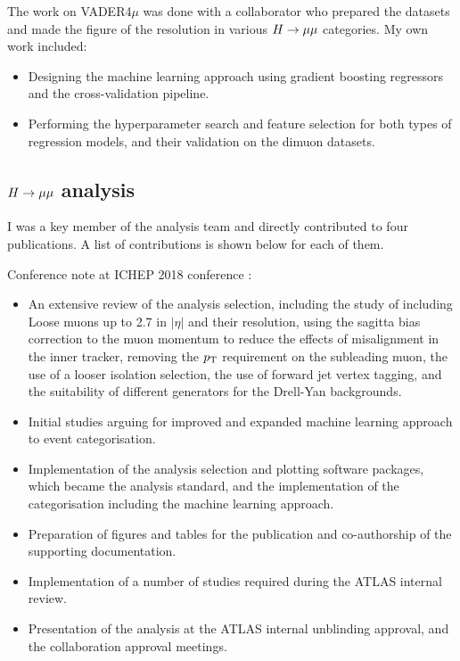 \begin{originality}
\noindent The work on VADER4$\mu$ was done with a collaborator who
prepared the datasets and made the figure of the resolution
in various $H \rightarrow \mu\mu$ categories. My own work included:
\begin{itemize}
\item Designing the machine learning approach using 
gradient boosting regressors and the cross-validation
pipeline.
\item Performing the hyperparameter search and feature
selection for both types of regression models, and
their validation on the dimuon datasets.
\end{itemize}

\subsection*{$H \rightarrow \mu\mu$ analysis}

I was a key member of the analysis team and directly
contributed to four publications. A list of contributions
is shown below for each of them.

\noindent Conference note at ICHEP 2018 conference \cite{ATLAS-CONF-2018-026}:
\begin{itemize}
\item An extensive review of the analysis selection, including the study
of including Loose muons up to 2.7 in $|\eta|$ and their resolution,
using the sagitta bias correction to the muon momentum to reduce
the effects of misalignment in the inner tracker, removing the $p_{\text{T}}$
requirement on the subleading muon, the use of a looser isolation
selection, the use of forward jet vertex tagging, and the suitability
of different generators for the Drell-Yan backgrounds.
\item Initial studies arguing for improved and expanded machine
learning approach to event categorisation.
\item Implementation of the analysis selection and plotting software
packages, which became the analysis standard, and the implementation
of the categorisation including the machine learning approach.
\item Preparation of figures and tables for the publication and
co-authorship of the supporting documentation.
\item Implementation of a number of studies required during the
ATLAS internal review.
\item Presentation of the analysis at the ATLAS internal unblinding
approval, and the collaboration approval meetings.
\end{itemize}


\end{originality}
